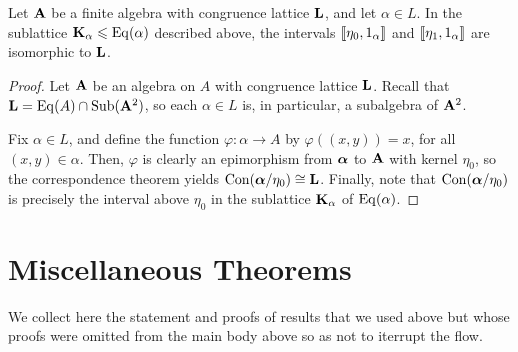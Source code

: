 \medskip


\begin{prop}
Let $\mathbf{A}$ be a finite algebra with
congruence lattice $\mathbf{L}$, and let $\alpha \in L$.
In the sublattice $\mathbf{K}_\alpha \leqslant \operatorname{Eq}(\alpha)$ described above, 
the intervals $\llbracket \eta_0, 1_\alpha\rrbracket$ and
$\llbracket \eta_1, 1_\alpha\rrbracket$ are isomorphic to $\mathbf{L}$.
\end{prop}

\begin{proof}
Let $\mathbf{A}$ be an algebra on $A$ with congruence
lattice $\mathbf{L}$. 
Recall that $\mathbf{L} = \operatorname{Eq}(A) \cap \operatorname{Sub}(\mathbf{A}^2)$, so each $\alpha\in L$ is, in
particular, a subalgebra of $\mathbf{A}^2$.  

Fix $\alpha \in L$, and define the function
$\varphi:\alpha \rightarrow A$ by $\varphi((x, y)) = x$, for all 
$(x,y) \in \alpha$. Then, $\varphi$ is clearly an epimorphism from $\boldsymbol{\alpha}$ to
$\mathbf{A}$ with kernel $\eta_0$, so the correspondence theorem yields
$\operatorname{Con}(\boldsymbol{\alpha}/\eta_0) \cong \mathbf{L}$.
Finally, note that $\operatorname{Con}(\boldsymbol{\alpha}/\eta_0)$ is precisely the interval
above $\eta_0$ in the sublattice $\mathbf{K}_\alpha$ of $\operatorname{Eq}(\alpha)$.
\end{proof}




\section{Miscellaneous Theorems}
We collect here the statement and proofs of results that we used above but whose
proofs were omitted from the main body above so as not to iterrupt the flow.


